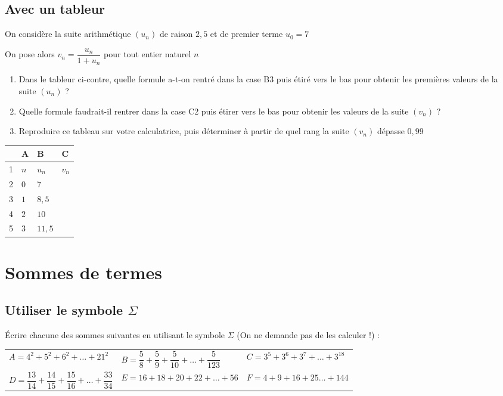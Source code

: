 \documentclass[oneside,12pt]{article}          %
\begin{document}
\subsection{Avec un tableur}
\begin{minipage}{0.6\textwidth} \restoreskip
	On considère la suite arithmétique $(u_n)$ de raison $2,5$ et de premier terme $u_0 = 7$
	
	On pose alors $ v_n = \dfrac{u_n}{1+ u_n}$ pour tout entier naturel $n$
	\begin{enumerate}[itemsep = 0pt]
		\item Dans le tableur ci-contre, quelle formule a-t-on rentré dans la case B3 puis étiré vers le bas pour obtenir les premières valeurs de la suite $(u_n)$ ?
		\item Quelle formule faudrait-il rentrer dans la case C2 puis étirer vers le bas pour obtenir les valeurs de la suite $(v_n)$ ?
		\item Reproduire ce tableau sur votre calculatrice, puis déterminer à partir de quel rang la suite $(v_n)$ dépasse $0,99$
	\end{enumerate}
\end{minipage} \hspace{5mm}
\begin{minipage}{0.35\textwidth}
	\begin{tabular}{| P{1cm} | P{1.5cm} | P{1.5cm} | P{1.5cm} |} \hline
		 & A & B & C \\  & $n$ & $u_n$ & $v_n$ \\  & $0$ & $7$ & \\  & $1$ & $8,5$ & \\  & $2$ & $10$ & \\  & $3$ & $11,5$ & \\ \hline
	\end{tabular}
\end{minipage}



\section{Sommes de termes}

\subsection{Utiliser le symbole $\Sigma$}
Écrire chacune des sommes suivantes en utilisant le symbole $\Sigma$ (On ne demande pas de les calculer !) :\\
\renewcommand{\arraystretch}{2.25}
\begin{tabular}{p{} p{} p{}}
	$A = 4^2 + 5^2 + 6^2 + \ldots + 21^2$ &
	$B = \dfrac{5}{8} + \dfrac{5}{9} + \dfrac{5}{10} + \ldots + \dfrac{5}{123}$ &
	$C = 3^5 + 3^6 + 3^7 + \ldots + 3^{18}$ \\
	$D = \dfrac{13}{14} + \dfrac{14}{15} + \dfrac{15}{16} + \ldots + \dfrac{33}{34}$ &
	$E = 16 + 18 + 20 + 22 + \ldots + 56$ &
	$F = 4 + 9 + 16 + 25 \ldots + 144$
\end{tabular}
\end{document}
